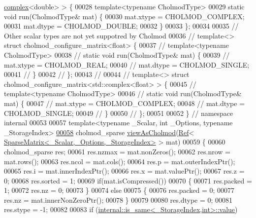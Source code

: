 \begin{DoxyCode}
      \hyperlink{structcomplex}{complex}<double> > \{
00028   \textcolor{keyword}{template}<\textcolor{keyword}{typename} CholmodType>
00029   \textcolor{keyword}{static} \textcolor{keywordtype}{void} run(CholmodType& mat) \{
00030     mat.xtype = CHOLMOD\_COMPLEX;
00031     mat.dtype = CHOLMOD\_DOUBLE;
00032   \}
00033 \};
00034 
00035 \textcolor{comment}{// Other scalar types are not yet suppotred by Cholmod}
00036 \textcolor{comment}{// template<> struct cholmod\_configure\_matrix<float> \{}
00037 \textcolor{comment}{//   template<typename CholmodType>}
00038 \textcolor{comment}{//   static void run(CholmodType& mat) \{}
00039 \textcolor{comment}{//     mat.xtype = CHOLMOD\_REAL;}
00040 \textcolor{comment}{//     mat.dtype = CHOLMOD\_SINGLE;}
00041 \textcolor{comment}{//   \}}
00042 \textcolor{comment}{// \};}
00043 \textcolor{comment}{//}
00044 \textcolor{comment}{// template<> struct cholmod\_configure\_matrix<std::complex<float> > \{}
00045 \textcolor{comment}{//   template<typename CholmodType>}
00046 \textcolor{comment}{//   static void run(CholmodType& mat) \{}
00047 \textcolor{comment}{//     mat.xtype = CHOLMOD\_COMPLEX;}
00048 \textcolor{comment}{//     mat.dtype = CHOLMOD\_SINGLE;}
00049 \textcolor{comment}{//   \}}
00050 \textcolor{comment}{// \};}
00051 
00052 \} \textcolor{comment}{// namespace internal}
00053 
00057 \textcolor{keyword}{template}<\textcolor{keyword}{typename} \_Scalar, \textcolor{keywordtype}{int} \_Options, \textcolor{keyword}{typename} \_StorageIndex>
\hyperlink{namespace_eigen_ac9fb9e40cfc9ddbdc7da84ee01bb7545}{00058} cholmod\_sparse \hyperlink{namespace_eigen_ac9fb9e40cfc9ddbdc7da84ee01bb7545}{viewAsCholmod}(\hyperlink{group___core___module_class_eigen_1_1_ref}{Ref}<
      \hyperlink{group___sparse_core___module_class_eigen_1_1_sparse_matrix}{SparseMatrix<\_Scalar,\_Options,\_StorageIndex>} > mat)
00059 \{
00060   cholmod\_sparse res;
00061   res.nzmax   = mat.nonZeros();
00062   res.nrow    = mat.rows();
00063   res.ncol    = mat.cols();
00064   res.p       = mat.outerIndexPtr();
00065   res.i       = mat.innerIndexPtr();
00066   res.x       = mat.valuePtr();
00067   res.z       = 0;
00068   res.sorted  = 1;
00069   \textcolor{keywordflow}{if}(mat.isCompressed())
00070   \{
00071     res.packed  = 1;
00072     res.nz = 0;
00073   \}
00074   \textcolor{keywordflow}{else}
00075   \{
00076     res.packed  = 0;
00077     res.nz = mat.innerNonZeroPtr();
00078   \}
00079 
00080   res.dtype   = 0;
00081   res.stype   = -1;
00082   
00083   \textcolor{keywordflow}{if} (\hyperlink{struct_eigen_1_1internal_1_1is__same}{internal::is\_same<\_StorageIndex,int>::value})

\end{DoxyCode}
